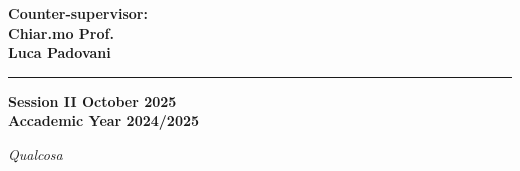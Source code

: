 \documentclass[12pt,a4paper,twoside]{book}
\theoremstyle{definition}
\theoremstyle{definition}
\theoremstyle{definition}
\begin{document}
\begin{titlepage}
\begin{minipage}[t]{0.37\textwidth}
    \vspace{1mm}

    {\large{\bf Counter-supervisor: \\ \vspace{-2mm} Chiar.mo Prof. \\ Luca Padovani}}
\end{minipage}

\vspace{20mm}
\rule[0.5cm]{15cm}{0.6mm}

\begin{center}
    {\large{\bf Session II October 2025 \\}}
    {\large{\bf Accademic Year 2024/2025\\}}
\end{center}

\end{titlepage}


\thispagestyle{plain}
\restoregeometry
\topmargin=6.5cm
\begin{flushright}
\emph{
\LARGE{Qualcosa}%
}
\end{flushright}

\newpage~\thispagestyle{plain}~\newpage

{}
\end{document}
